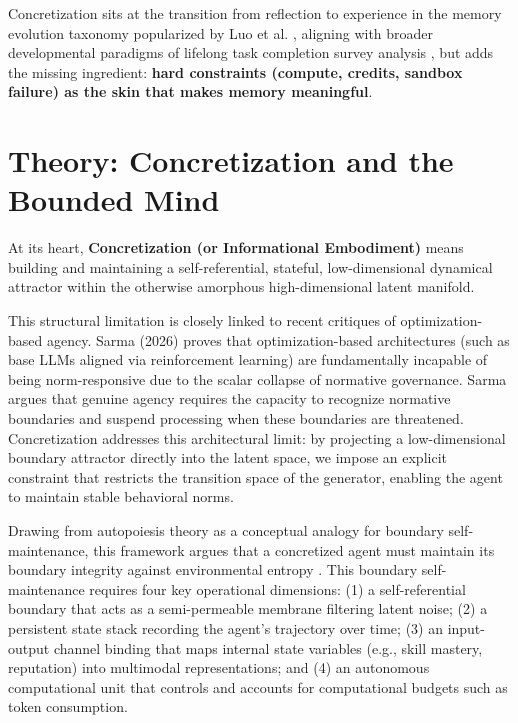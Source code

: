 \documentclass[10pt,journal,compsoc]{IEEEtran}
\begin{document}
Concretization sits at the transition from reflection to experience in the memory evolution taxonomy popularized by Luo et al. \cite{luo2026}, aligning with broader developmental paradigms of lifelong task completion survey analysis \cite{zhang2024survey, pink2025}, but adds the missing ingredient: \textbf{hard constraints (compute, credits, sandbox failure) as the skin that makes memory meaningful}.



\section{Theory: Concretization and the Bounded Mind}
At its heart, \textbf{Concretization (or Informational Embodiment)} means building and maintaining a self-referential, stateful, low-dimensional dynamical attractor within the otherwise amorphous high-dimensional latent manifold.

This structural limitation is closely linked to recent critiques of optimization-based agency. Sarma (2026) \cite{sarma2026} proves that optimization-based architectures (such as base LLMs aligned via reinforcement learning) are fundamentally incapable of being norm-responsive due to the scalar collapse of normative governance. Sarma argues that genuine agency requires the capacity to recognize normative boundaries and suspend processing when these boundaries are threatened. Concretization addresses this architectural limit: by projecting a low-dimensional boundary attractor directly into the latent space, we impose an explicit constraint that restricts the transition space of the generator, enabling the agent to maintain stable behavioral norms.

Drawing from autopoiesis theory as a conceptual analogy for boundary self-maintenance, this framework argues that a concretized agent must maintain its boundary integrity against environmental entropy \cite{maturana1980}. This boundary self-maintenance requires four key operational dimensions: (1) a self-referential boundary that acts as a semi-permeable membrane filtering latent noise; (2) a persistent state stack recording the agent's trajectory over time; (3) an input-output channel binding that maps internal state variables (e.g., skill mastery, reputation) into multimodal representations; and (4) an autonomous computational unit that controls and accounts for computational budgets such as token consumption.
\end{document}
